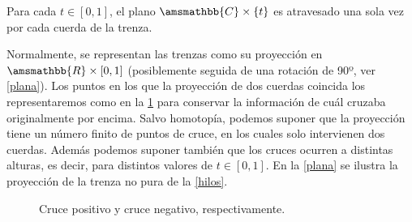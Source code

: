 \documentclass[bibtex, anon]{TEMat-article}
\newcommand{\R}{\amsmathbb{R}}
\newcommand{\CC}{\amsmathbb{C}}
\begin{document}
\begin{observacion}
	Para cada $t\in[0,1]$, el plano $\CC\times\{t\}$ es atravesado una sola vez por cada cuerda de la trenza. 
\end{observacion}

Normalmente, se representan las trenzas como su proyección en $\R\times[0,1]$ (posiblemente seguida de una rotación de 90º, ver \cref{plana}). Los puntos en los que la proyección de dos cuerdas coincida los representaremos como en la \cref{cruce} para conservar la información de cuál cruzaba originalmente por encima. Salvo homotopía, podemos suponer que la proyección tiene un número finito de puntos de cruce, en los cuales solo intervienen dos cuerdas. Además podemos suponer también que los cruces ocurren a distintas alturas, es decir, para distintos valores de $t\in[0,1]$. En la \cref{plana} se ilustra la proyección de la trenza no pura de la \cref{hilos}. 
\begin{figure}[h!]
	\centering
	
	\caption{Cruce positivo y cruce negativo, respectivamente.}\label{cruce}
	\end{figure}
\end{document}
